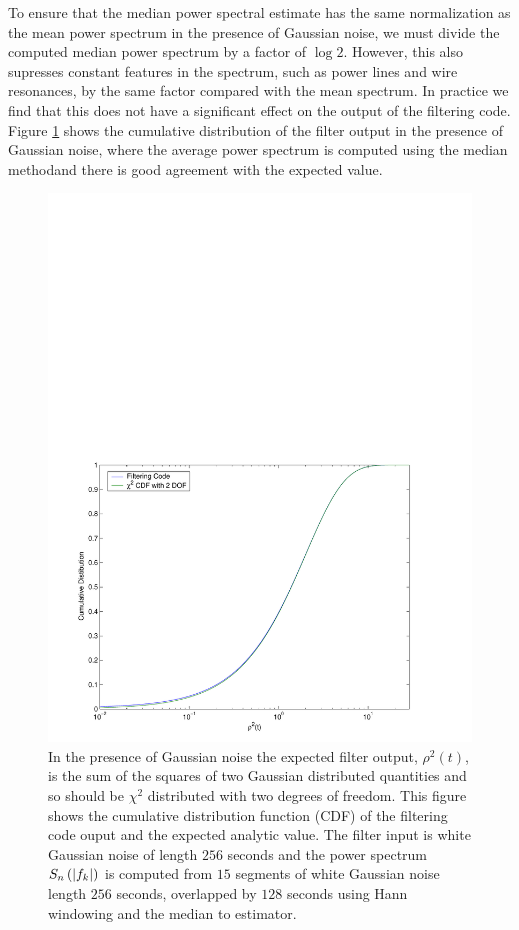 To ensure that the median power spectral estimate has the same normalization
as the mean power spectrum in the presence of Gaussian noise, we must divide
the computed median power spectrum by a factor of $\log 2$. However, this also
supresses constant features in the spectrum, such as power lines and wire
resonances, by the same factor compared with the mean spectrum. In practice we
find that this does not have a significant effect on the output of the
filtering code. Figure \ref{f:rhosq_median_cdf} shows the cumulative
distribution of the filter output in the presence of Gaussian noise, where the
average power spectrum is computed using the median methodand there is good
agreement with the expected value.
\begin{figure}[htb]
\label{f:rhosq_median_cdf}
\begin{center}
\includegraphics[width=\linewidth]{figures/findchirp/rhosq_gaussian_cdf}
\end{center}
\caption{%
In the presence of Gaussian noise the expected filter output, $\rho^2(t)$, is
the sum of the squares of two Gaussian distributed quantities and so should be
$\chi^2$ distributed with two degrees of freedom. This figure shows the
cumulative distribution function (CDF) of the filtering code ouput and the
expected analytic value. The filter input is white Gaussian noise of length
$256$ seconds and the power spectrum $S_n\left(\left|f_{k}\right|\right)$ is computed from $15$ segments
of white Gaussian noise length $256$ seconds, overlapped by $128$ seconds
using Hann windowing and the median to estimator.
}
\end{figure}

